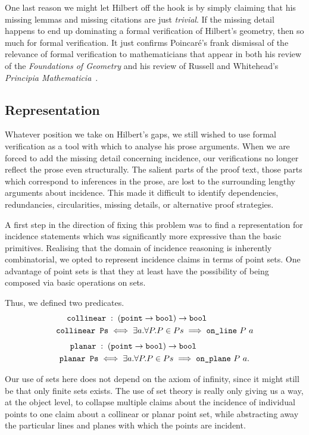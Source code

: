 One last reason we might let Hilbert off the hook is by simply claiming that his missing lemmas and missing citations are just \emph{trivial}. If the missing detail happens to end up dominating a formal verification of Hilbert's geometry, then so much for formal verification. It just confirms Poincar\'{e}'s frank dismissal of the relevance of formal verification to mathematicians that appear in both his review of the \emph{Foundations of Geometry} and his review of Russell and Whitehead's \emph{Principia Mathematicia}~\cite{PoincareReview,PoincareShackles}.

\subsection{Representation}
Whatever position we take on Hilbert's gaps, we still wished to use formal verification as a tool with which to analyse his prose arguments. When we are forced to add the missing detail concerning incidence, our verifications no longer reflect the prose even structurally. The salient parts of the proof text, those parts which correspond to inferences in the prose, are lost to the surrounding lengthy arguments about incidence. This made it difficult to identify dependencies, redundancies, circularities, missing details, or alternative proof strategies.

A first step in the direction of fixing this problem was to find a representation for incidence statements which was significantly more expressive than the basic primitives. Realising that the domain of incidence reasoning is inherently combinatorial, we opted to represent incidence claims in terms of point sets. One advantage of point sets is that they at least have the possibility of being composed via basic operations on sets.

Thus, we defined two predicates.
\begin{align*}
\texttt{collinear}\;&:\;(\texttt{point}\rightarrow\texttt{bool})\rightarrow\texttt{bool}
\\\texttt{collinear\ Ps} &\iff \exists a. \forall P. P \in Ps \implies \texttt{on\_line}\ P\ a
\end{align*}
\begin{align*}
\texttt{planar}\;&:\;(\texttt{point}\rightarrow\texttt{bool})\rightarrow\texttt{bool}
\\\texttt{planar\ Ps} &\iff \exists a. \forall P. P \in Ps \implies \texttt{on\_plane}\ P\ a.
\end{align*}

Our use of sets here does not depend on the axiom of infinity, since it might still be that only finite sets exists. The use of set theory is really only giving us a way, at the object level, to collapse multiple claims about the incidence of individual points to one claim about a collinear or planar point set, while abstracting away the particular lines and planes with which the points are incident. %

